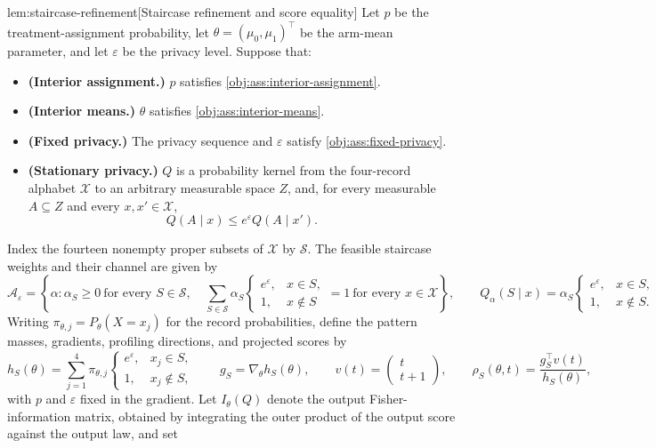 \begin{lemmav}{lem:staircase-refinement}[Staircase refinement and score equality]
Let \(p\) be the treatment-assignment probability, let \(\theta=(\mu_0,\mu_1)^\top\) be the arm-mean parameter, and let \(\varepsilon\) be the privacy level. Suppose that:
\begin{itemize}
\item \textbf{(Interior assignment.)} \(p\) satisfies \cref{obj:ass:interior-assignment}.
\item \textbf{(Interior means.)} \(\theta\) satisfies \cref{obj:ass:interior-means}.
\item \textbf{(Fixed privacy.)} The privacy sequence and \(\varepsilon\) satisfy \cref{obj:ass:fixed-privacy}.
\item \textbf{(Stationary privacy.)} \(Q\) is a probability kernel from the four-record alphabet \(\mathcal X\) to an arbitrary measurable space \(Z\), and, for every measurable \(A\subseteq Z\) and every \(x,x'\in\mathcal X\),
\[
Q(A\mid x)\le e^\varepsilon Q(A\mid x').
\]
\end{itemize}
Index the fourteen nonempty proper subsets of \(\mathcal X\) by \(\mathcal S\). The feasible staircase weights and their channel are given by
\[
\mathcal A_\varepsilon
=
\left\{
\alpha:
\alpha_S\ge0\ \text{for every }S\in\mathcal S,\quad
\sum_{S\in\mathcal S}\alpha_S
\begin{cases}
e^\varepsilon,&x\in S,\\
1,&x\notin S
\end{cases}
=1\ \text{for every }x\in\mathcal X
\right\},
\qquad
Q_\alpha(S\mid x)=\alpha_S
\begin{cases}
e^\varepsilon,&x\in S,\\
1,&x\notin S.
\end{cases}
\]
Writing \(\pi_{\theta,j}=P_\theta(X=x_j)\) for the record probabilities, define the pattern masses, gradients, profiling directions, and projected scores by
\[
h_S(\theta)
=
\sum_{j=1}^{4}\pi_{\theta,j}
\begin{cases}
e^\varepsilon,&x_j\in S,\\
1,&x_j\notin S,
\end{cases}
\qquad
g_S=\nabla_\theta h_S(\theta),
\qquad
v(t)=\begin{pmatrix}t\\t+1\end{pmatrix},
\qquad
\rho_S(\theta,t)=\frac{g_S^\top v(t)}{h_S(\theta)},
\]
with \(p\) and \(\varepsilon\) fixed in the gradient. Let \(I_\theta(Q)\) denote the output Fisher-information matrix, obtained by integrating the outer product of the output score against the output law, and set

\end{lemmav}
